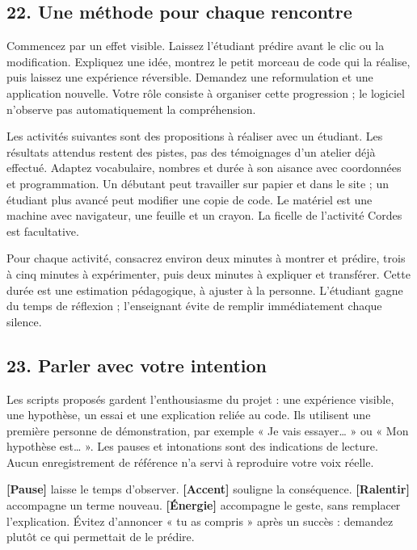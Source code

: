 \documentclass[
  canadien,
  11pt,
  letterpaper,
]{article}
\begin{document}
\subsection{22. Une méthode pour chaque
rencontre}\label{une-muxe9thode-pour-chaque-rencontre}

Commencez par un effet visible. Laissez l'étudiant prédire avant le clic
ou la modification. Expliquez une idée, montrez le petit morceau de code
qui la réalise, puis laissez une expérience réversible. Demandez une
reformulation et une application nouvelle. Votre rôle consiste à
organiser cette progression ; le logiciel n'observe pas automatiquement
la compréhension.

Les activités suivantes sont des propositions à réaliser avec un
étudiant. Les résultats attendus restent des pistes, pas des témoignages
d'un atelier déjà effectué. Adaptez vocabulaire, nombres et durée à son
aisance avec coordonnées et programmation. Un débutant peut travailler
sur papier et dans le site ; un étudiant plus avancé peut modifier une
copie de code. Le matériel est une machine avec navigateur, une feuille
et un crayon. La ficelle de l'activité Cordes est facultative.

Pour chaque activité, consacrez environ deux minutes à montrer et
prédire, trois à cinq minutes à expérimenter, puis deux minutes à
expliquer et transférer. Cette durée est une estimation pédagogique, à
ajuster à la personne. L'étudiant gagne du temps de réflexion ;
l'enseignant évite de remplir immédiatement chaque silence.

\subsection{23. Parler avec votre
intention}\label{parler-avec-votre-intention}

Les scripts proposés gardent l'enthousiasme du projet : une expérience
visible, une hypothèse, un essai et une explication reliée au code. Ils
utilisent une première personne de démonstration, par exemple « Je vais
essayer\ldots{} » ou « Mon hypothèse est\ldots{} ». Les pauses et
intonations sont des indications de lecture. Aucun enregistrement de
référence n'a servi à reproduire votre voix réelle.

\textbf{{[}Pause{]}} laisse le temps d'observer. \textbf{{[}Accent{]}}
souligne la conséquence. \textbf{{[}Ralentir{]}} accompagne un terme
nouveau. \textbf{{[}Énergie{]}} accompagne le geste, sans remplacer
l'explication. Évitez d'annoncer « tu as compris » après un succès :
demandez plutôt ce qui permettait de le prédire.
\end{document}
